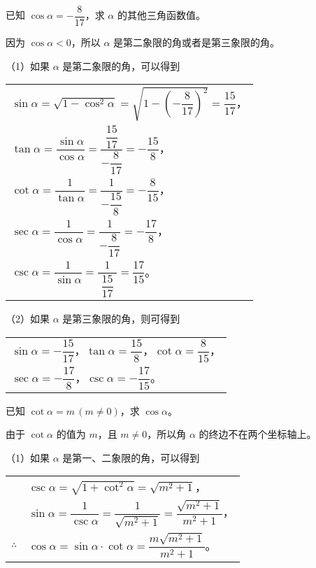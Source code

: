 \vspace{0.5em}
\liti 已知 $\cos \alpha = -\dfrac{8}{17}$，求 $\alpha$ 的其他三角函数值。
\vspace{0.5em}

\jie 因为 $\cos \alpha < 0$，所以 $\alpha$ 是第二象限的角或者是第三象限的角。

（1）如果 $\alpha$ 是第二象限的角，可以得到

\quad \begin{tabular}[t]{l}
    \rule{0pt}{3em}$\sin \alpha = \sqrt{1 - \cos^2 \alpha} = \sqrt{1 - \left(-\dfrac{8}{17} \right)^2} = \dfrac{15}{17}$，\\
    \rule{0pt}{2em}$\tan \alpha = \dfrac{\sin \alpha}{\cos \alpha} = \dfrac{\dfrac{15}{17}}{-\dfrac{8}{17}} = -\dfrac{15}{8}$，\\
    \rule{0pt}{2em}$\cot \alpha = \dfrac{1}{\tan \alpha} = \dfrac{1}{-\dfrac{15}{8}} = -\dfrac{8}{15}$，\\
    \rule{0pt}{2em}$\sec \alpha = \dfrac{1}{\cos \alpha} = \dfrac{1}{-\dfrac{8}{17}} = -\dfrac{17}{8}$，\\
    \rule{0pt}{2em}$\csc \alpha = \dfrac{1}{\sin \alpha} = \dfrac{1}{\; \dfrac{15}{17} \;} = \dfrac{17}{15}$。
\end{tabular}
\vspace{0.5em}

（2）如果 $\alpha$ 是第三象限的角，则可得到

\quad\begin{tabular}[t]{l}
    \rule{0pt}{2em}$\sin \alpha = -\dfrac{15}{17}$，$\tan \alpha = \dfrac{15}{8}$，$\cot \alpha = \dfrac{8}{15}$，\\
    \rule{0pt}{2em}$\sec \alpha = -\dfrac{17}{8}$，$\csc \alpha = -\dfrac{17}{15}$。
\end{tabular}
\vspace{0.5em}

\liti 已知 $\cot \alpha = m \, (m \neq 0)$，求 $\cos \alpha$。

\jie 由于 $\cot \alpha$ 的值为 $m$，且 $m \neq 0$，所以角 $\alpha$ 的终边不在两个坐标轴上。

（1）如果 $\alpha$ 是第一、二象限的角，可以得到

\begin{tabular}{p{2em}l}
    & $\csc \alpha = \sqrt{1 + \cot^2 \alpha} = \sqrt{m^2 + 1}$，\\
    \rule{0pt}{2em} & $\sin \alpha = \dfrac{1}{\csc \alpha} = \dfrac{1}{\sqrt{m^2 + 1}} = \dfrac{\sqrt{m^2 + 1}}{m^2 + 1}$，\\
    \rule{0pt}{2em} $\therefore$ & $\cos \alpha = \sin \alpha \cdot \cot \alpha = \dfrac{m \sqrt{m^2 + 1}}{m^2 + 1}$。
\end{tabular}
\vspace{0.5em}

